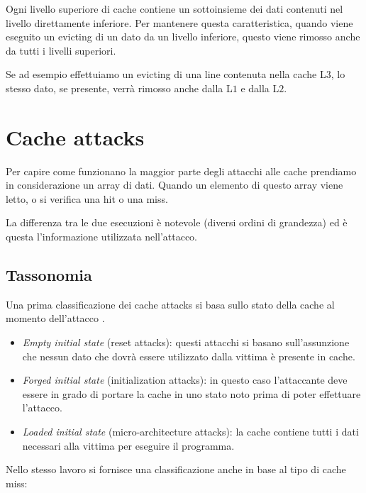 				Ogni livello superiore di cache contiene un sottoinsieme dei dati contenuti nel livello direttamente inferiore. Per mantenere questa caratteristica, quando viene eseguito un evicting di un dato da un livello inferiore, questo viene rimosso anche da tutti i livelli superiori.
				
				Se ad esempio effettuiamo un evicting di una line contenuta nella cache L$3$, lo stesso dato, se presente, verrà rimosso anche dalla L$1$ e dalla L$2$.
				
	\section{Cache attacks}
		Per capire come funzionano la maggior parte degli attacchi alle cache prendiamo in considerazione un array di dati. Quando un elemento di questo array viene letto, o si verifica una hit o una miss.
		
		La differenza tra le due esecuzioni è notevole (diversi ordini di grandezza) ed è questa l'informazione utilizzata nell'attacco.
		
		\subsection{Tassonomia}
			Una prima classificazione dei cache attacks si basa sullo stato della cache al momento dell'attacco \cite{canteaut2006understanding}.
			
			\begin{itemize}
				\item \emph{Empty initial state} (reset attacks): questi attacchi si basano sull'assunzione che nessun dato che dovrà essere utilizzato dalla vittima è presente in cache.
				\item \emph{Forged initial state} (initialization attacks): in questo caso l'attaccante deve essere in grado di portare la cache in uno stato noto prima di poter effettuare l'attacco.
				\item \emph{Loaded initial state} (micro-architecture attacks): la cache contiene tutti i dati necessari alla vittima per eseguire il programma.
			\end{itemize}
		
			Nello stesso lavoro si fornisce una classificazione anche in base al tipo di cache miss:
			
